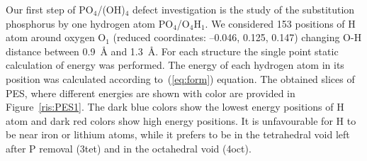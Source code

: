 Our first step of PO$_4$/(OH)$_4$ defect investigation is the study of the substitution phosphorus by one hydrogen atom PO$_4$/O$_4$H$_1$. We considered 153 positions of H atom around oxygen O$_1$ (reduced coordinates: --0.046, 0.125, 0.147) changing O-H distance between 0.9{~\AA} and 1.3{~\AA}. For each structure the single point static calculation of energy was performed. The energy of each hydrogen atom in its position was calculated according to~(\ref{eq:form}) equation. The obtained slices of PES, where different energies are shown with color are provided in Figure~\ref{ris:PES1}. The dark blue colors show   the lowest energy positions of H atom and dark red colors show high energy positions. It is unfavourable for H to be near iron or lithium atoms, while it prefers to be in the tetrahedral void left after P removal (3tet) and in the octahedral void (4oct).


